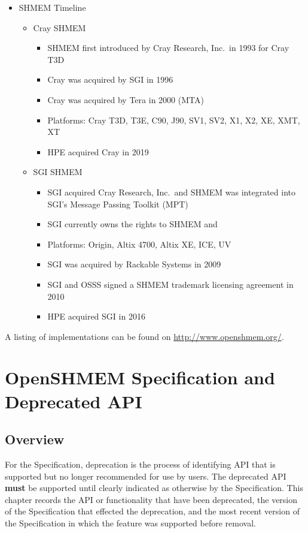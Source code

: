 \begin{itemize}
\item SHMEM Timeline
  \begin{itemize}
  \item Cray SHMEM
    \begin{itemize}
    \item SHMEM first introduced by Cray Research, Inc.\ in 1993 for Cray T3D
    \item Cray was acquired by \ac{SGI} in 1996
    \item Cray was acquired by Tera in 2000 (MTA)
    \item Platforms: Cray T3D, T3E, C90, J90, SV1, SV2, X1, X2, XE, XMT, XT
    \item \ac{HPE} acquired Cray in 2019
    \end{itemize}
  \item \ac{SGI} SHMEM
    \begin{itemize}
    \item \ac{SGI} acquired Cray Research, Inc.\ and SHMEM was integrated into
      \ac{SGI}'s Message Passing Toolkit (MPT)
    \item \ac{SGI} currently owns the rights to SHMEM and \openshmem
    \item Platforms: Origin, Altix 4700, Altix XE, ICE, UV
    \item \ac{SGI} was acquired by Rackable Systems in 2009
    \item \ac{SGI} and \ac{OSSS} signed a
      SHMEM trademark licensing agreement in 2010
    \item \ac{HPE} acquired \ac{SGI} in 2016
    \end{itemize}
  \end{itemize}
\end{itemize}

A listing of \openshmem implementations can be found on
\url{http://www.openshmem.org/}.








\chapter{OpenSHMEM Specification and Deprecated API}\label{sec:dep}

\section{Overview}\label{dep:overview}
For the \openshmem Specification, deprecation is the process of identifying
API that is supported but no longer recommended for use by users.
The deprecated API \textbf{must} be supported until clearly
indicated as otherwise by the Specification.
This chapter records the API or functionality that have been deprecated, the
version of the \openshmem Specification that effected the deprecation, and the
most recent version of the \openshmem Specification in which the feature was
supported before removal.

